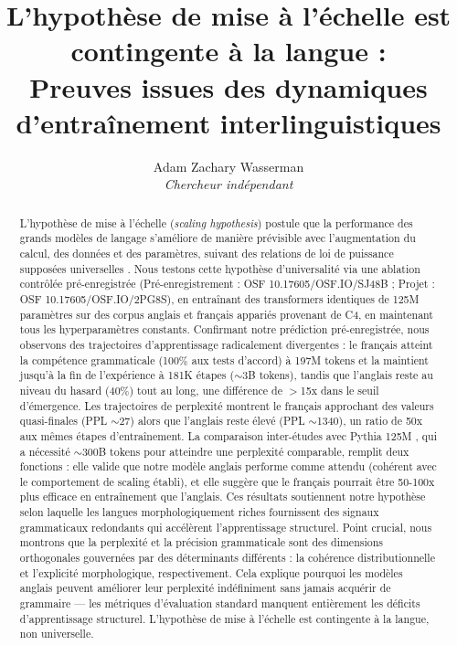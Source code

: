 \documentclass[11pt,a4paper]{article}
\title{L'hypothèse de mise à l'échelle est contingente à la langue :\\
Preuves issues des dynamiques d'entraînement interlinguistiques}
\author{Adam Zachary Wasserman\\
\textit{Chercheur indépendant}}
\date{}
\begin{document}
\maketitle

\begin{abstract}
L'hypothèse de mise à l'échelle (\textit{scaling hypothesis}) postule que la performance des grands modèles de langage s'améliore de manière prévisible avec l'augmentation du calcul, des données et des paramètres, suivant des relations de loi de puissance supposées universelles \citep{kaplan2020scaling, hoffmann2022training}. Nous testons cette hypothèse d'universalité via une ablation contrôlée pré-enregistrée (Pré-enregistrement : OSF 10.17605/OSF.IO/SJ48B ; Projet : OSF 10.17605/OSF.IO/2PG8S), en entraînant des transformers identiques de 125M paramètres sur des corpus anglais et français appariés provenant de C4, en maintenant tous les hyperparamètres constants. Confirmant notre prédiction pré-enregistrée, nous observons des trajectoires d'apprentissage radicalement divergentes : le français atteint la compétence grammaticale (100\% aux tests d'accord) à 197M tokens et la maintient jusqu'à la fin de l'expérience à 181K étapes ($\sim$3B tokens), tandis que l'anglais reste au niveau du hasard (40\%) tout au long, une différence de $>$15x dans le seuil d'émergence. Les trajectoires de perplexité montrent le français approchant des valeurs quasi-finales (PPL $\sim$27) alors que l'anglais reste élevé (PPL $\sim$1340), un ratio de 50x aux mêmes étapes d'entraînement. La comparaison inter-études avec Pythia 125M \citep{biderman2023pythia}, qui a nécessité $\sim$300B tokens pour atteindre une perplexité comparable, remplit deux fonctions : elle valide que notre modèle anglais performe comme attendu (cohérent avec le comportement de scaling établi), et elle suggère que le français pourrait être 50-100x plus efficace en entraînement que l'anglais. Ces résultats soutiennent notre hypothèse selon laquelle les langues morphologiquement riches fournissent des signaux grammaticaux redondants qui accélèrent l'apprentissage structurel. Point crucial, nous montrons que la perplexité et la précision grammaticale sont des dimensions orthogonales gouvernées par des déterminants différents : la cohérence distributionnelle et l'explicité morphologique, respectivement. Cela explique pourquoi les modèles anglais peuvent améliorer leur perplexité indéfiniment sans jamais acquérir de grammaire --- les métriques d'évaluation standard manquent entièrement les déficits d'apprentissage structurel. L'hypothèse de mise à l'échelle est contingente à la langue, non universelle.


\end{abstract}
\end{document}
